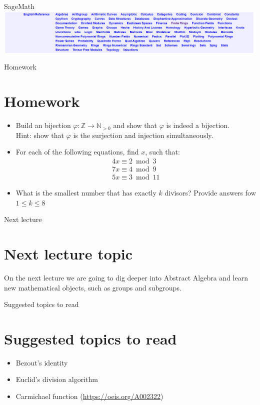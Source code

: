 \documentclass{beamer}
\begin{document}
\begin{frame}{SageMath}
    \includegraphics[width=\linewidth]{fig/sagemath.png}
\end{frame}

\begin{frame}{Homework}
    \section{Homework}
    \begin{itemize}
        \item Build an bijection $\varphi : \mathbb{Z} \to \mathbb{N}_{>0}$ and 
        show that $\varphi$ is indeed a bijection. \\ 
        Hint: show that $\varphi$ is the surjection and injection simultaneously.
        \item For each of the following equations, find $x$, such that:
        \begin{eqnarray*}
            4x \equiv 2 \bmod 3 \\
            7x \equiv 4 \bmod 9 \\
            5x \equiv 3 \bmod 11
        \end{eqnarray*}
        \item What is the smallest number that has exactly $k$ divisors?
        Provide answers fow $1 \le k \le 8$
    \end{itemize}
\end{frame}

\begin{frame}{Next lecture}
    \section{Next lecture topic}
    On the next lecture we are going to dig deeper into Abstract Algebra and 
    learn new mathematical objects, such as groups and subgroups.
\end{frame}

\begin{frame}{Suggested topics to read}
    \section{Suggested topics to read}
    \begin{itemize}
        \item Bezout's identity
        \item Euclid's division algorithm
        \item Carmichael function (\url{https://oeis.org/A002322})
    \end{itemize}    
\end{frame}
\end{document}
